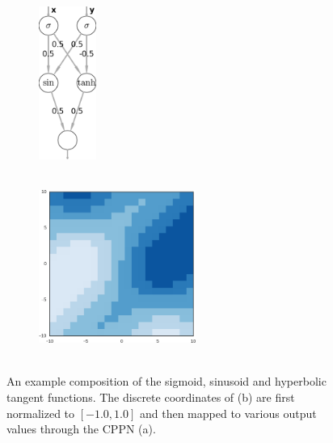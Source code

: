 \begin{figure}
\centering
\begin{subfigure}[b]{.25\columnwidth}
\centering
\includegraphics[height=5cm, keepaspectratio]{fig/2-cppn}
\caption{~}
\end{subfigure}\hfill%
\begin{subfigure}[b]{.65\columnwidth}
\centering
\includegraphics[height=5cm, keepaspectratio]{fig/cppn_pattern}
\caption{~}
\end{subfigure}

\caption[Example CPPN]{An example composition of the sigmoid, sinusoid and hyperbolic tangent functions.
The discrete coordinates of (b) are first normalized to $[-1.0, 1.0]$ and then mapped to various output values through the CPPN (a).
}
\label{fig:cppn}
\end{figure}


